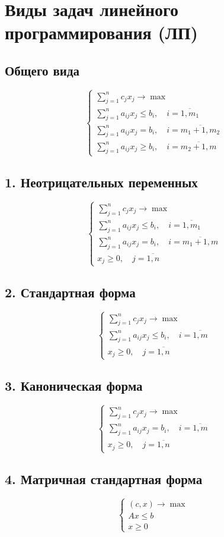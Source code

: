\documentclass[17pt]{extarticle}
\begin{document}
\section{Виды задач линейного программирования (ЛП)}

\subsection{Общего вида}
\[
    \begin{cases}
        \sum\limits_{j=1}^{n} c_j x_j \to \max                                 \\
        \sum\limits_{j=1}^{n} a_{ij} x_j \le b_i, \quad i = \overline{1,m_1}   \\
        \sum\limits_{j=1}^{n} a_{ij} x_j = b_i, \quad i = \overline{m_1+1,m_2} \\
        \sum\limits_{j=1}^{n} a_{ij} x_j \ge b_i, \quad i = \overline{m_2+1,m}
    \end{cases}
\]

\subsection{1. Неотрицательных переменных}
\[
    \begin{cases}
        \sum\limits_{j=1}^{n} c_j x_j \to \max                               \\
        \sum\limits_{j=1}^{n} a_{ij} x_j \le b_i, \quad i = \overline{1,m_1} \\
        \sum\limits_{j=1}^{n} a_{ij} x_j = b_i, \quad i = \overline{m_1+1,m} \\
        x_j \ge 0, \quad j = \overline{1,n}
    \end{cases}
\]

\subsection{2. Стандартная форма}
\[
    \begin{cases}
        \sum\limits_{j=1}^{n} c_j x_j \to \max                             \\
        \sum\limits_{j=1}^{n} a_{ij} x_j \le b_i, \quad i = \overline{1,m} \\
        x_j \ge 0, \quad j = \overline{1,n}
    \end{cases}
\]

\subsection{3. Каноническая форма}
\[
    \begin{cases}
        \sum\limits_{j=1}^{n} c_j x_j \to \max                           \\
        \sum\limits_{j=1}^{n} a_{ij} x_j = b_i, \quad i = \overline{1,m} \\
        x_j \ge 0, \quad j = \overline{1,n}
    \end{cases}
\]

\subsection{4. Матричная стандартная форма}
\[
    \begin{cases}
        (c, x) \to \max \\
        A x \le b       \\
        x \ge 0
    \end{cases}
\]
\end{document}
